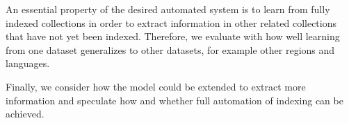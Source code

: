 

An essential property of the desired automated system is to learn from fully indexed collections in order to extract information in other related collections that have not yet been indexed.
Therefore, we evaluate with how well learning from one dataset generalizes to other datasets, for example other regions and languages.

Finally, we consider how the model could be extended to extract more information and speculate how and whether full automation of indexing can be achieved.

